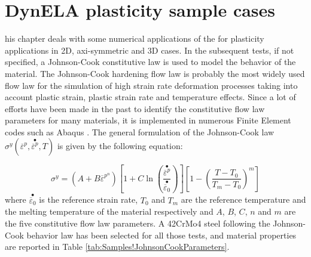 %
%
%
\chapter{DynELA plasticity sample cases}

\startcontents[chapters]
\printmyminitoc[1]his chapter deals with some numerical applications of
the \DynELA for plasticity applications in 2D, axi-symmetric and
3D cases. In the subsequent tests, if not specified, a Johnson-Cook
constitutive law is used to model the behavior of the material. The
Johnson-Cook hardening flow law is probably the most widely used flow
law for the simulation of high strain rate deformation processes taking
into account plastic strain, plastic strain rate and temperature effects.
Since a lot of efforts have been made in the past to identify the
constitutive flow law parameters for many materials, it is implemented
in numerous Finite Element codes such as Abaqus \cite{abaqus20146}.
The general formulation of the Johnson-Cook law $\sigma^{y}(\overline{\varepsilon}^{p},\stackrel{\bullet}{\overline{\varepsilon}^{p}},T)$
is given by the following equation:

\begin{equation}
\sigma^{y}=\left(A+B\overline{\varepsilon}^{p^{n}}\right)\left[1+C\ln\left(\frac{\stackrel{\bullet}{\overline{\varepsilon}^{p}}}{\stackrel{\bullet}{\overline{\varepsilon}_{0}}}\right)\right]\left[1-\left(\frac{T-T_{0}}{T_{m}-T_{0}}\right)^{m}\right]\label{eq:Samples!Johnson-Cook}
\end{equation}
where $\stackrel{\bullet}{\overline{\varepsilon}_{0}}$ is the reference
strain rate, $T_{0}$ and $T_{m}$ are the reference temperature and
the melting temperature of the material respectively and $A$, $B$,
$C$, $n$ and $m$ are the five constitutive flow law parameters.
A 42CrMo4 steel following the Johnson-Cook behavior law has been selected
for all those tests, and material properties are reported in Table
\ref{tab:Samples!JohnsonCookParameters}.

